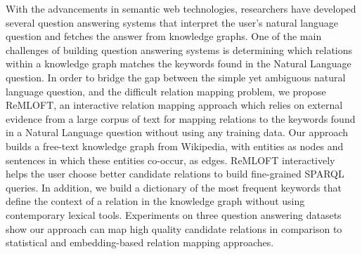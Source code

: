 With the advancements in semantic web technologies, researchers have developed several question answering systems that interpret the user’s natural language question and fetches the answer from knowledge graphs. One of the main challenges of building question answering systems is determining which relations within a knowledge graph matches the keywords found in the Natural Language question. In order to bridge the gap between the simple yet ambiguous natural language question, and the difficult relation mapping problem, we propose ReMLOFT, an interactive relation mapping approach which relies on external evidence from a large corpus of text for mapping relations to the keywords found in a Natural Language question without using any training data. Our approach builds a free-text knowledge graph from Wikipedia, with entities as nodes and sentences in which these entities co-occur, as edges. ReMLOFT interactively helps the user choose better candidate relations to build fine-grained SPARQL queries. In addition, we build a dictionary of the most frequent keywords that define the context of a relation in the knowledge graph without using contemporary lexical tools. Experiments on three question answering datasets show our approach can map high quality candidate relations in comparison to statistical and embedding-based relation mapping approaches. 
